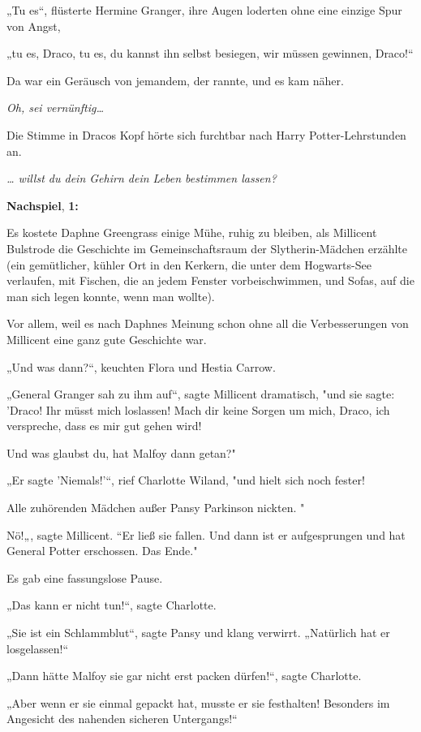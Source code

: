 {„Tu es“, flüsterte Hermine Granger, ihre Augen loderten ohne eine einzige Spur von Angst,

„tu es, Draco, tu es, du kannst ihn selbst besiegen, wir müssen gewinnen, Draco!“

Da war ein Geräusch von jemandem, der rannte, und es kam näher.

\emph{\hfill\break Oh, sei vernünftig…}

Die Stimme in Dracos Kopf hörte sich furchtbar nach Harry Potter-Lehrstunden an.

\emph{… willst du dein Gehirn dein Leben bestimmen lassen?}

\textbf{Nachspiel}, \textbf{1:}

Es kostete Daphne Greengrass einige Mühe, ruhig zu bleiben, als Millicent Bulstrode die Geschichte im Gemeinschaftsraum der Slytherin-Mädchen erzählte (ein gemütlicher, kühler Ort in den Kerkern, die unter dem Hogwarts-See verlaufen, mit Fischen, die an jedem Fenster vorbeischwimmen, und Sofas, auf die man sich legen konnte, wenn man wollte).

Vor allem, weil es nach Daphnes Meinung schon ohne all die Verbesserungen von Millicent eine ganz gute Geschichte war.

„Und was dann?“, keuchten Flora und Hestia Carrow.

„General Granger sah zu ihm auf“, sagte Millicent dramatisch, "und sie sagte: 'Draco! Ihr müsst mich loslassen! Mach dir keine Sorgen um mich, Draco, ich verspreche, dass es mir gut gehen wird!

Und was glaubst du, hat Malfoy dann getan?"

„Er sagte 'Niemals!'“, rief Charlotte Wiland, "und hielt sich noch fester!

Alle zuhörenden Mädchen außer Pansy Parkinson nickten. "

Nö!„, sagte Millicent. “Er ließ sie fallen. Und dann ist er aufgesprungen und hat General Potter erschossen. Das Ende."

Es gab eine fassungslose Pause.

„Das kann er nicht tun!“, sagte Charlotte.

„Sie ist ein Schlammblut“, sagte Pansy und klang verwirrt. „Natürlich hat er losgelassen!“

„Dann hätte Malfoy sie gar nicht erst packen dürfen!“, sagte Charlotte.

„Aber wenn er sie einmal gepackt hat, musste er sie festhalten! Besonders im Angesicht des nahenden sicheren Untergangs!“

}
